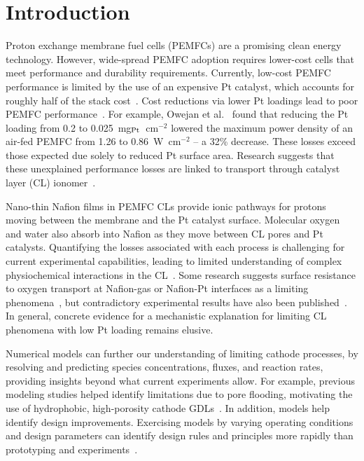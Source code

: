 \documentclass[final,3p,times,twocolumn]{elsarticle}    %
\begin{document}
\section{Introduction}
Proton exchange membrane fuel cells (PEMFCs) are a promising clean energy technology. However, wide-spread PEMFC adoption requires lower-cost cells that meet performance and durability requirements. Currently, low-cost PEMFC performance is limited by the use of an expensive Pt catalyst, which accounts for roughly half of the stack cost~\cite{bib:kongkanand_2016, bib:xie_2021}. Cost reductions via lower Pt loadings lead to poor PEMFC performance~\cite{bib:sakai_2009, bib:ohma_2011, bib:leimin_2009, bib:harzer_2018, bib:banham_2021}. For example, Owejan et al.~\cite{bib:owejan_2013} found that reducing the Pt loading from 0.2 to 0.025~mg$_{\rm Pt}$~cm$^{-2}$ lowered the maximum power density of an air-fed PEMFC from 1.26 to 0.86~W~cm$^{-2}$ -- a 32\% decrease. These losses exceed those expected due solely to reduced Pt surface area. Research suggests that these unexplained performance losses are linked to transport through catalyst layer (CL) ionomer~\cite{bib:paul_2011, bib:paul_2014, bib:weber_2014, bib:modestino_2013, bib:jung_2013}.

Nano-thin Nafion films in PEMFC CLs provide ionic pathways for protons moving between the membrane and the Pt catalyst surface. Molecular oxygen and water also absorb into Nafion as they move between CL pores and Pt catalysts. Quantifying the losses associated with each process is challenging for current experimental capabilities, leading to limited understanding of complex physiochemical interactions in the CL~\cite{bib:weber_2014, bib:modestino_2013, bib:jung_2013}. Some research suggests surface resistance to oxygen transport at Nafion-gas or Nafion-Pt interfaces as a limiting phenomena~\cite{bib:weber_kusoglu_2014, bib:nonoyama_2011, bib:kongkanand_2016}, but contradictory experimental results have also been published~\cite{bib:liu_2015}. In general, concrete evidence for a mechanistic explanation for limiting CL phenomena with low Pt loading remains elusive.

Numerical models can further our understanding of limiting cathode processes, by resolving and predicting species concentrations, fluxes, and reaction rates, providing insights beyond what current experiments allow. For example, previous modeling studies helped identify limitations due to pore flooding, motivating the use of hydrophobic, high-porosity cathode GDLs~\cite{bib:chu_2003, bib:abdollahzadeh_2014, bib:weber_darling_2004}. In addition, models help identify design improvements. Exercising models by varying operating conditions and design parameters can identify design rules and principles more rapidly than prototyping and experiments~\cite{bib:weber_2014, bib:arif_2020}. 
\end{document}
